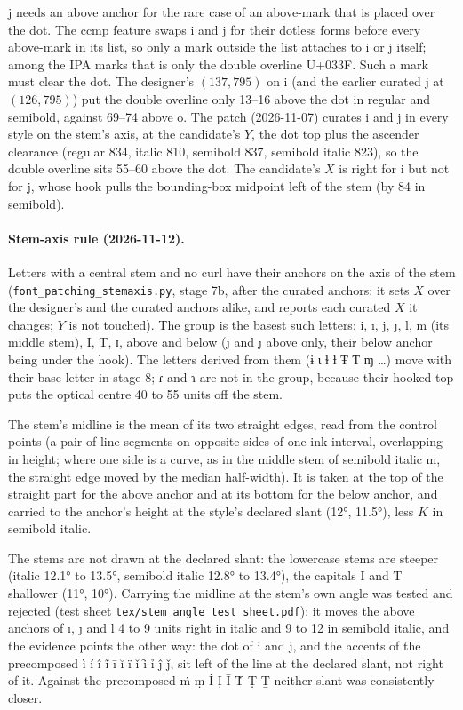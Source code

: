 \documentclass[landscape]{article}
\begin{document}
j needs an above anchor for the rare case of an above-mark that is placed over the dot.
The ccmp feature swaps i and j for their dotless forms before every above-mark in its list,
so only a mark outside the list attaches to i or j itself; among the IPA marks that is only
the double overline U+033F.
Such a mark must clear the dot.
The designer's $(137, 795)$ on i (and the earlier curated j at $(126, 795)$) put the double overline
only 13--16 above the dot in regular and semibold, against 69--74 above o.
The patch (2026-11-07) curates i and j in every style on the stem's axis,
at the candidate's $Y$, the dot top plus the ascender clearance
(regular 834, italic 810, semibold 837, semibold italic 823),
so the double overline sits 55--60 above the dot.
The candidate's $X$ is right for i but not for j, whose hook pulls the bounding-box midpoint left
of the stem (by 84 in semibold).

\paragraph{Stem-axis rule (2026-11-12).}
Letters with a central stem and no curl have their anchors on the axis of the stem (\verb|font_patching_stemaxis.py|, stage 7b, after the curated anchors:
it sets $X$ over the designer's and the curated anchors alike, and reports each curated $X$ it changes; $Y$ is not touched).
The group is the basest such letters: i, ı, j, ȷ, l, m (its middle stem), I, T, ɪ, above and below (j and ȷ above only, their below anchor being under the hook).
The letters derived from them (ɨ ɩ ɫ ƚ Ŧ Ƭ ɱ \ldots) move with their base letter in stage 8; ɾ and ɿ are not in the group, because their hooked top puts the optical centre 40 to 55 units off the stem.

The stem's midline is the mean of its two straight edges, read from the control points (a pair of line segments on opposite sides of one ink interval, overlapping in height;
where one side is a curve, as in the middle stem of semibold italic m, the straight edge moved by the median half-width).
It is taken at the top of the straight part for the above anchor and at its bottom for the below anchor, and carried to the anchor's height at the style's declared slant (12°, 11.5°), less $K$ in semibold italic.

The stems are not drawn at the declared slant: the lowercase stems are steeper (italic 12.1° to 13.5°, semibold italic 12.8° to 13.4°), the capitals I and T shallower (11°, 10°).
Carrying the midline at the stem's own angle was tested and rejected (test sheet \verb|tex/stem_angle_test_sheet.pdf|):
it moves the above anchors of ı, ȷ and l 4 to 9 units right in italic and 9 to 12 in semibold italic, and the evidence points the other way:
the dot of i and j, and the accents of the precomposed ì í î ĩ ī ĭ ï ǐ ȋ ỉ ĵ ǰ, sit left of the line at the declared slant, not right of it.
Against the precomposed ṁ ṃ İ Ị Ī Ṫ Ṭ Ṯ neither slant was consistently closer.
\end{document}
